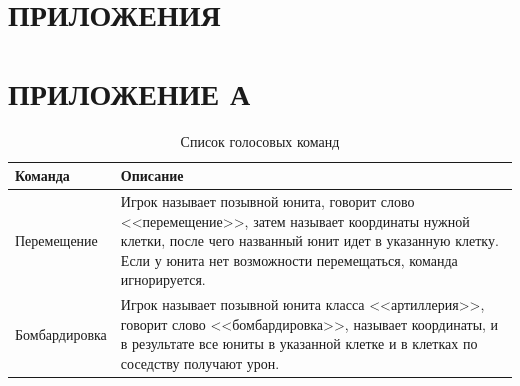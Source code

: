 \appendix
\section*{ПРИЛОЖЕНИЯ}
\setcounter{section}{1}
\setcounter{figure}{0}
\setcounter{table}{0}
\setcounter{lstlisting}{0}
\renewcommand{\thefigure}{}
\renewcommand{\thetable}{}
\renewcommand{\thelstlisting}{}


\captionsetup[table]{labelformat=empty, labelsep=none, justification=centering, position=top,font=fourteenpt}
\captionsetup[lstlisting]{labelformat=empty, labelsep=none, justification=centering, position=top,font=fourteenpt}
\captionsetup[figure]{labelformat=empty, labelsep=none, justification=centering, position=top,font=fourteenpt}

\section*{ПРИЛОЖЕНИЕ А}
\begin{table}[ht]
    \caption{Список голосовых команд}
    \centering
    \renewcommand{\arraystretch}{1.2}
    \renewcommand{\tablename}{Табл.}
    \begin{tabularx}{\textwidth}{|X|X|}
    \hline
    \textbf{Команда}&\textbf{Описание}\\
    \hline
    Перемещение&Игрок называет позывной юнита, говорит слово <<перемещение>>, затем называет координаты нужной клетки, после чего названный юнит идет в указанную клетку. Если у юнита нет возможности перемещаться, команда игнорируется.\\
    \hline
    Бомбардировка&Игрок называет позывной юнита класса <<артиллерия>>, говорит слово <<бомбардировка>>, называет координаты, и в результате все юниты в указанной клетке и в клетках по соседству получают урон.\\
    \hline
    \end{tabularx}
\end{table}
\pagebreak

